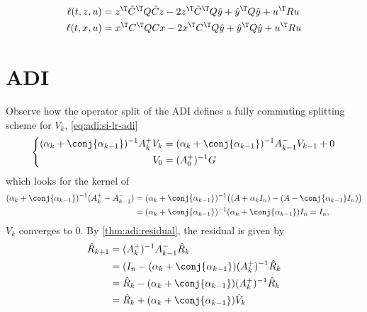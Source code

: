 \begin{align}
  \ell(t, z, u) &= z^\T \tilde C^\T Q \tilde C z - 2z^\T \tilde C^\T Q \hat y + \hat y^\T Q \hat y + u^\T R u \\
  \ell(t, x, u) &= x^\T C^\T Q C x - 2x^\T C^\T Q \hat y + \hat y^\T Q \hat y + u^\T R u
\end{align}
\cite[(3.12)]{Lang2017}

\section{ADI}

Observe how the operator split of the \ac{ADI} defines a fully commuting splitting scheme for $V_k$,
\cf \eqref{eq:adi:si-lr-adi}
\begin{equation}
\left\{
\begin{aligned}
  (\alpha_k + \conj{\alpha_{k-1}})^{-1} A_k^+ V_k &= (\alpha_k + \conj{\alpha_{k-1}})^{-1} A_{k-1}^- V_{k-1} + 0 \\
  V_0 &= (A_0^+)^{-1} G
\end{aligned}
\right.
\end{equation}
which looks for the kernel of
\begin{align*}
  (\alpha_k + \conj{\alpha_{k-1}})^{-1} (A_k^+ - A_{k-1}^-)
  &= (\alpha_k + \conj{\alpha_{k-1}})^{-1} \big( (A + \alpha_k I_n) - (A - \conj{\alpha_{k-1}} I_n) \big) \\
  &= (\alpha_k + \conj{\alpha_{k-1}})^{-1} (\alpha_k + \conj{\alpha_{k-1}}) I_n
  = I_n
  ,
\end{align*}
\ie $V_k$ converges to $0$.
By \autoref{thm:adi:residual},
the residual is given by
\begin{align*}
  \hat R_{k+1}
  &= (A_k^+)^{-1} A_{k-1}^- \hat R_k \\
  &= (I_n - (\alpha_k + \conj{\alpha_{k-1}}) (A_k^+)^{-1} \hat R_k \\
  &= \hat R_k - (\alpha_k + \conj{\alpha_{k-1}}) (A_k^+)^{-1} \hat R_k \\
  &= \hat R_k + (\alpha_k + \conj{\alpha_{k-1}}) \hat V_k
\end{align*}
